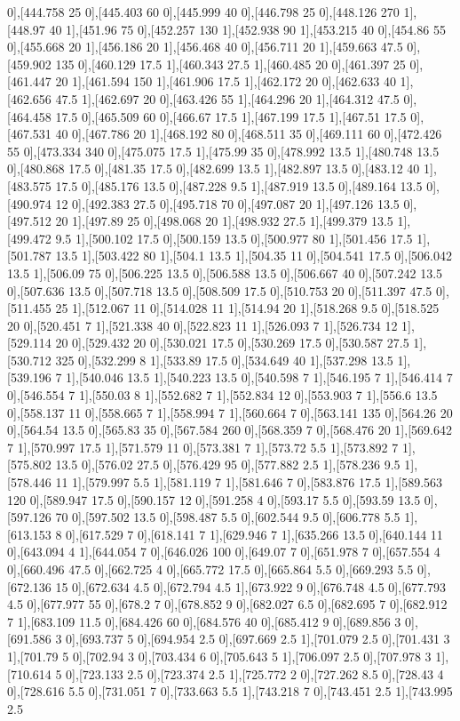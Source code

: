 {0],[444.758 25 0],[445.403 60 0],[445.999 40 0],[446.798 25 0],[448.126 270 1],[448.97 40 1],[451.96 75 0],[452.257 130 1],[452.938 90 1],[453.215 40 0],[454.86 55 0],[455.668 20 1],[456.186 20 1],[456.468 40 0],[456.711 20 1],[459.663 47.5 0],[459.902 135 0],[460.129 17.5 1],[460.343 27.5 1],[460.485 20 0],[461.397 25 0],[461.447 20 1],[461.594 150 1],[461.906 17.5 1],[462.172 20 0],[462.633 40 1],[462.656 47.5 1],[462.697 20 0],[463.426 55 1],[464.296 20 1],[464.312 47.5 0],[464.458 17.5 0],[465.509 60 0],[466.67 17.5 1],[467.199 17.5 1],[467.51 17.5 0],[467.531 40 0],[467.786 20 1],[468.192 80 0],[468.511 35 0],[469.111 60 0],[472.426 55 0],[473.334 340 0],[475.075 17.5 1],[475.99 35 0],[478.992 13.5 1],[480.748 13.5 0],[480.868 17.5 0],[481.35 17.5 0],[482.699 13.5 1],[482.897 13.5 0],[483.12 40 1],[483.575 17.5 0],[485.176 13.5 0],[487.228 9.5 1],[487.919 13.5 0],[489.164 13.5 0],[490.974 12 0],[492.383 27.5 0],[495.718 70 0],[497.087 20 1],[497.126 13.5 0],[497.512 20 1],[497.89 25 0],[498.068 20 1],[498.932 27.5 1],[499.379 13.5 1],[499.472 9.5 1],[500.102 17.5 0],[500.159 13.5 0],[500.977 80 1],[501.456 17.5 1],[501.787 13.5 1],[503.422 80 1],[504.1 13.5 1],[504.35 11 0],[504.541 17.5 0],[506.042 13.5 1],[506.09 75 0],[506.225 13.5 0],[506.588 13.5 0],[506.667 40 0],[507.242 13.5 0],[507.636 13.5 0],[507.718 13.5 0],[508.509 17.5 0],[510.753 20 0],[511.397 47.5 0],[511.455 25 1],[512.067 11 0],[514.028 11 1],[514.94 20 1],[518.268 9.5 0],[518.525 20 0],[520.451 7 1],[521.338 40 0],[522.823 11 1],[526.093 7 1],[526.734 12 1],[529.114 20 0],[529.432 20 0],[530.021 17.5 0],[530.269 17.5 0],[530.587 27.5 1],[530.712 325 0],[532.299 8 1],[533.89 17.5 0],[534.649 40 1],[537.298 13.5 1],[539.196 7 1],[540.046 13.5 1],[540.223 13.5 0],[540.598 7 1],[546.195 7 1],[546.414 7 0],[546.554 7 1],[550.03 8 1],[552.682 7 1],[552.834 12 0],[553.903 7 1],[556.6 13.5 0],[558.137 11 0],[558.665 7 1],[558.994 7 1],[560.664 7 0],[563.141 135 0],[564.26 20 0],[564.54 13.5 0],[565.83 35 0],[567.584 260 0],[568.359 7 0],[568.476 20 1],[569.642 7 1],[570.997 17.5 1],[571.579 11 0],[573.381 7 1],[573.72 5.5 1],[573.892 7 1],[575.802 13.5 0],[576.02 27.5 0],[576.429 95 0],[577.882 2.5 1],[578.236 9.5 1],[578.446 11 1],[579.997 5.5 1],[581.119 7 1],[581.646 7 0],[583.876 17.5 1],[589.563 120 0],[589.947 17.5 0],[590.157 12 0],[591.258 4 0],[593.17 5.5 0],[593.59 13.5 0],[597.126 70 0],[597.502 13.5 0],[598.487 5.5 0],[602.544 9.5 0],[606.778 5.5 1],[613.153 8 0],[617.529 7 0],[618.141 7 1],[629.946 7 1],[635.266 13.5 0],[640.144 11 0],[643.094 4 1],[644.054 7 0],[646.026 100 0],[649.07 7 0],[651.978 7 0],[657.554 4 0],[660.496 47.5 0],[662.725 4 0],[665.772 17.5 0],[665.864 5.5 0],[669.293 5.5 0],[672.136 15 0],[672.634 4.5 0],[672.794 4.5 1],[673.922 9 0],[676.748 4.5 0],[677.793 4.5 0],[677.977 55 0],[678.2 7 0],[678.852 9 0],[682.027 6.5 0],[682.695 7 0],[682.912 7 1],[683.109 11.5 0],[684.426 60 0],[684.576 40 0],[685.412 9 0],[689.856 3 0],[691.586 3 0],[693.737 5 0],[694.954 2.5 0],[697.669 2.5 1],[701.079 2.5 0],[701.431 3 1],[701.79 5 0],[702.94 3 0],[703.434 6 0],[705.643 5 1],[706.097 2.5 0],[707.978 3 1],[710.614 5 0],[723.133 2.5 0],[723.374 2.5 1],[725.772 2 0],[727.262 8.5 0],[728.43 4 0],[728.616 5.5 0],[731.051 7 0],[733.663 5.5 1],[743.218 7 0],[743.451 2.5 1],[743.995 2.5 }
